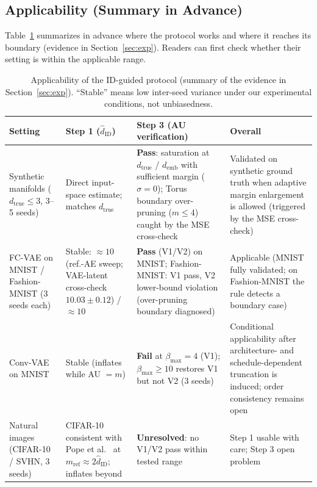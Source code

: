 \documentclass[make,article,submit,pdftex,moreauthors]{Definitions/mdpi}
\newcommand{\hatdID}{\hat{d}_{\mathrm{ID}}}
\newcommand{\dtrue}{d_{\mathrm{true}}}
\newcommand{\demb}{d_{\mathrm{emb}}}
\begin{document}
\subsection{Applicability (Summary in Advance)}\label{sec:protocol_applicability}

Table~\ref{tab:applicability} summarizes in advance where the protocol works
and where it reaches its boundary (evidence in Section~\ref{sec:exp}).
Readers can first check whether their setting is within the applicable
range.

\begin{table}[H]
\caption{Applicability of the ID-guided protocol (summary of the evidence in
Section~\ref{sec:exp}). ``Stable'' means low inter-seed variance under our
experimental conditions, not unbiasedness.}
\label{tab:applicability}
\small
\begin{tabular}{p{2.6cm}p{2.9cm}p{3.1cm}p{3.6cm}}
\toprule
\textbf{Setting} & \textbf{Step 1 ($\hatdID$)} & \textbf{Step 3 (AU verification)} & \textbf{Overall} \\
\midrule
Synthetic manifolds ($\dtrue \leq 3$, 3--5 seeds) & Direct input-space estimate; matches $\dtrue$ & \textbf{Pass}: saturation at $\dtrue$ / $\demb$ with sufficient margin ($\sigma = 0$); Torus boundary over-pruning ($m \leq 4$) caught by the MSE cross-check & Validated on synthetic ground truth when adaptive margin enlargement is allowed (triggered by the MSE cross-check) \\
\addlinespace
FC-VAE on MNIST / Fashion-MNIST (3 seeds each) & Stable: $\approx 10$ (ref.-AE sweep; VAE-latent cross-check $10.03 \pm 0.12$) / $\approx 10$ & \textbf{Pass} (V1/V2) on MNIST; Fashion-MNIST: V1 pass, V2 lower-bound violation (over-pruning boundary diagnosed) & Applicable (MNIST fully validated; on Fashion-MNIST the rule detects a boundary case) \\
\addlinespace
Conv-VAE on MNIST & Stable (inflates while AU $= m$) & \textbf{Fail} at $\beta_{\max} = 4$ (V1); $\beta_{\max} \geq 10$ restores V1 but not V2 (3 seeds) & Conditional applicability after architecture- and schedule-dependent truncation is induced; order consistency remains open \\
\addlinespace
Natural images (CIFAR-10 / SVHN, 3 seeds) & CIFAR-10 consistent with Pope et al.~\cite{pope2021intrinsic} at $m_{\mathrm{ref}} \approx 2\hatdID$; inflates beyond & \textbf{Unresolved}: no V1/V2 pass within tested range & Step 1 usable with care; Step 3 open problem \\
\bottomrule
\end{tabular}
\end{table}
\end{document}
